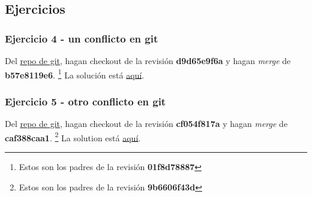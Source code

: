 \subsection{Ejercicios}
\subsubsection{Ejercicio 4 - un conflicto en git}
Del \hyperref[git_repo]{repo de git}, hagan checkout de la revisión {\bf d9d65e9f6a} y hagan {\it merge} de {\bf b57e8119e6}.
\footnote{Estos son los padres de la revisión {\bf 01f8d78887}} La solución está \hyperref[exercise_04]{aquí}.

\subsubsection{Ejercicio 5 - otro conflicto en git}
Del \hyperref[git_repo]{repo de git}, hagan checkout de la revisión {\bf cf054f817a} y hagan {\it merge} de {\bf caf388caa1}.
\footnote{Estos son los padres de la revisión {\bf 9b6606f43d}} La solution está \hyperref[exercise_05]{aquí}.
